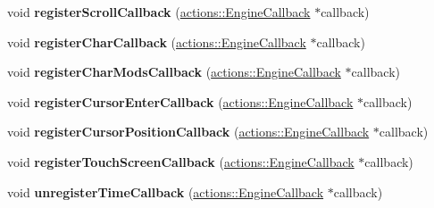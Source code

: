 \begin{DoxyCompactItemize}
\item 
\hypertarget{classfillwave_1_1Engine_a53e2161afc9fbe78a453a516bcc66af8}{}void {\bfseries register\+Scroll\+Callback} (\hyperlink{classfillwave_1_1actions_1_1EngineCallback}{actions\+::\+Engine\+Callback} $\ast$callback)\label{classfillwave_1_1Engine_a53e2161afc9fbe78a453a516bcc66af8}

\item 
\hypertarget{classfillwave_1_1Engine_a646a3870ba2dc8d5e3ee18fafec78fe7}{}void {\bfseries register\+Char\+Callback} (\hyperlink{classfillwave_1_1actions_1_1EngineCallback}{actions\+::\+Engine\+Callback} $\ast$callback)\label{classfillwave_1_1Engine_a646a3870ba2dc8d5e3ee18fafec78fe7}

\item 
\hypertarget{classfillwave_1_1Engine_a126526a78edecf96121bf46efe860434}{}void {\bfseries register\+Char\+Mods\+Callback} (\hyperlink{classfillwave_1_1actions_1_1EngineCallback}{actions\+::\+Engine\+Callback} $\ast$callback)\label{classfillwave_1_1Engine_a126526a78edecf96121bf46efe860434}

\item 
\hypertarget{classfillwave_1_1Engine_afb9188ecbb770607cc4120f7ed65d932}{}void {\bfseries register\+Cursor\+Enter\+Callback} (\hyperlink{classfillwave_1_1actions_1_1EngineCallback}{actions\+::\+Engine\+Callback} $\ast$callback)\label{classfillwave_1_1Engine_afb9188ecbb770607cc4120f7ed65d932}

\item 
\hypertarget{classfillwave_1_1Engine_a3b70461af284fca3b751ab98b3b8e4e3}{}void {\bfseries register\+Cursor\+Position\+Callback} (\hyperlink{classfillwave_1_1actions_1_1EngineCallback}{actions\+::\+Engine\+Callback} $\ast$callback)\label{classfillwave_1_1Engine_a3b70461af284fca3b751ab98b3b8e4e3}

\item 
\hypertarget{classfillwave_1_1Engine_a0c229b7f05a6f87e851c855de806a8cd}{}void {\bfseries register\+Touch\+Screen\+Callback} (\hyperlink{classfillwave_1_1actions_1_1EngineCallback}{actions\+::\+Engine\+Callback} $\ast$callback)\label{classfillwave_1_1Engine_a0c229b7f05a6f87e851c855de806a8cd}

\item 
\hypertarget{classfillwave_1_1Engine_a2ae2ac7c85fa6bf5637ed637cb1967ad}{}void {\bfseries unregister\+Time\+Callback} (\hyperlink{classfillwave_1_1actions_1_1EngineCallback}{actions\+::\+Engine\+Callback} $\ast$callback)\label{classfillwave_1_1Engine_a2ae2ac7c85fa6bf5637ed637cb1967ad}


\end{DoxyCompactItemize}
